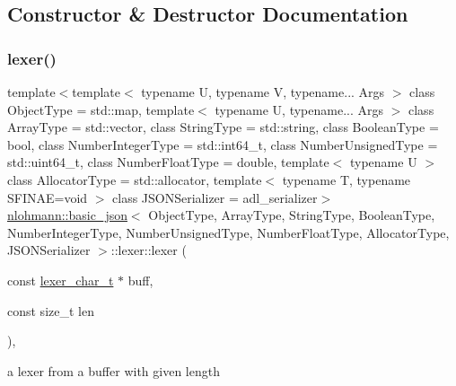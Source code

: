 \subsection{Constructor \& Destructor Documentation}
\mbox{\label{classnlohmann_1_1basic__json_1_1lexer_a6f8eac8d6d2b95ce3f10b04104ecda8d}} 
\subsubsection{\texorpdfstring{lexer()}{lexer()}\hspace{0.1cm}{\footnotesize\ttfamily [1/4]}}
{\footnotesize\ttfamily template$<$template$<$ typename U, typename V, typename... Args $>$ class Object\+Type = std\+::map, template$<$ typename U, typename... Args $>$ class Array\+Type = std\+::vector, class String\+Type  = std\+::string, class Boolean\+Type  = bool, class Number\+Integer\+Type  = std\+::int64\+\_\+t, class Number\+Unsigned\+Type  = std\+::uint64\+\_\+t, class Number\+Float\+Type  = double, template$<$ typename U $>$ class Allocator\+Type = std\+::allocator, template$<$ typename T, typename S\+F\+I\+N\+A\+E=void $>$ class J\+S\+O\+N\+Serializer = adl\+\_\+serializer$>$ \\
\hyperlink{classnlohmann_1_1basic__json}{nlohmann\+::basic\+\_\+json}$<$ Object\+Type, Array\+Type, String\+Type, Boolean\+Type, Number\+Integer\+Type, Number\+Unsigned\+Type, Number\+Float\+Type, Allocator\+Type, J\+S\+O\+N\+Serializer $>$\+::lexer\+::lexer (\begin{DoxyParamCaption}\item[{const \hyperlink{classnlohmann_1_1basic__json_1_1lexer_abe04be04d0575249f8806c334bacbc80}{lexer\+\_\+char\+\_\+t} $\ast$}]{buff,  }\item[{const size\+\_\+t}]{len }\end{DoxyParamCaption})\hspace{0.3cm}{\ttfamily [inline]}, {\ttfamily [noexcept]}}



a lexer from a buffer with given length 

\mbox{\label{classnlohmann_1_1basic__json_1_1lexer_aa85fafea3a014e6226be866d33112c49}} 
